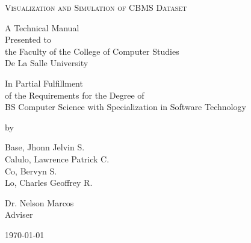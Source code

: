 \begin{titlepage}
\begin{center}

{\Large
    \textsc{Visualization and Simulation of CBMS Dataset}
\par}


\bigskip
A Technical Manual\\
Presented to\\
the Faculty of the College of Computer Studies\\
De La Salle University

\bigskip
In Partial Fulfillment\\
of the Requirements for the Degree of\\
BS Computer Science with Specialization in Software Technology

\bigskip
by

Base, Jhonn Jelvin S.\\
Calulo, Lawrence Patrick C.\\
Co, Bervyn S.\\
Lo, Charles Geoffrey R.

\bigskip
Dr. Nelson Marcos\\
Adviser

\bigskip
\today

\bigskip
\date{today}
\end{center}
\end{titlepage}
